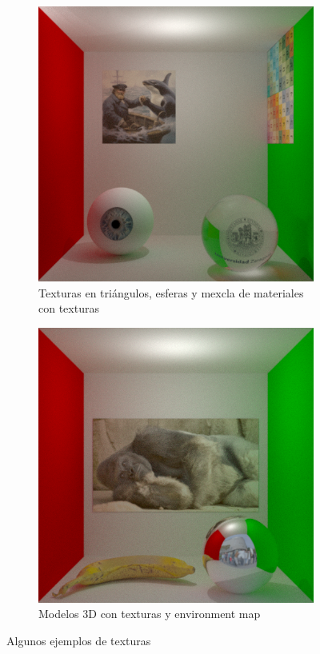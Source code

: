 \documentclass{article}
\begin{document}
\begin{figure}[H]
\begin{subfigure}[h]{0.4\linewidth}
\includegraphics[width=\linewidth]{imgs/corneltex.png}
\caption{Texturas en triángulos, esferas y mexcla de materiales con texturas}
\end{subfigure}
\hfill
\begin{subfigure}[h]{0.4\linewidth}
\includegraphics[width=\linewidth]{imgs/harambe.png}
\caption{Modelos 3D con texturas y environment map}
\end{subfigure}
\caption{Algunos ejemplos de texturas}
\end{figure}
\end{document}

